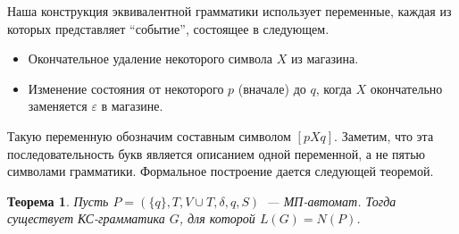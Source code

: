 \documentclass[a4paper,12pt]{article}
\newtheorem*{theorem}{Теорема}
\begin{document}
Наша конструкция эквивалентной грамматики использует переменные, каждая из которых представляет ``событие'', состоящее в следующем.
\begin{itemize}
	\item Окончательное удаление некоторого символа \(X\) из магазина.
	\item Изменение состояния от некоторого \(p\) (вначале) до \(q\), когда \(X\) окончательно заменяется \(\varepsilon\) в магазине.
\end{itemize}

Такую переменную обозначим составным символом \([pXq]\). Заметим, что эта последовательность букв является описанием одной переменной, а не пятью символами грамматики. Формальное построение дается следующей теоремой.
\begin{theorem}
	Пусть \(P = (\{q\}, T, V \cup T, \delta, q, S)\)~--- МП-автомат. Тогда существует КС-грамматика \(G\), для которой \(L(G) = N(P)\).
\end{theorem}
\end{document}
